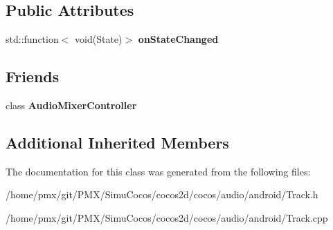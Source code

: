 \subsection*{Public Attributes}
\begin{DoxyCompactItemize}
\item 
\mbox{\label{classcocos2d_1_1experimental_1_1Track_a3a9fe820dc5393d139a6931b5c019983}} 
std\+::function$<$ void(State)$>$ {\bfseries on\+State\+Changed}
\end{DoxyCompactItemize}
\subsection*{Friends}
\begin{DoxyCompactItemize}
\item 
\mbox{\label{classcocos2d_1_1experimental_1_1Track_acc68ac62a010d35e88b6c7c57967e5ac}} 
class {\bfseries Audio\+Mixer\+Controller}
\end{DoxyCompactItemize}
\subsection*{Additional Inherited Members}


The documentation for this class was generated from the following files\+:\begin{DoxyCompactItemize}
\item 
/home/pmx/git/\+P\+M\+X/\+Simu\+Cocos/cocos2d/cocos/audio/android/Track.\+h\item 
/home/pmx/git/\+P\+M\+X/\+Simu\+Cocos/cocos2d/cocos/audio/android/Track.\+cpp\end{DoxyCompactItemize}
